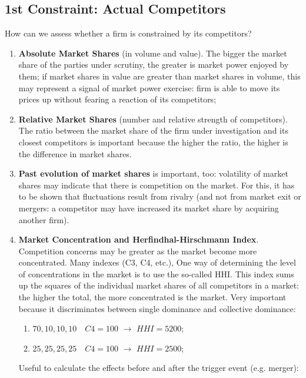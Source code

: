     \subsection{1st Constraint: Actual Competitors}

        How can we assess whether a firm is constrained by its competitors?
        \begin{enumerate}
            \item \textbf{Absolute Market Shares} (in volume and value). The bigger the market share of the parties under scrutiny, the greater is market power enjoyed by them; if market shares in value are greater than market shares in volume, this may represent a signal of market power exercise: firm is able to move its prices up without fearing a reaction of its competitors;
            \item \textbf{Relative Market Shares} (number and relative strength of competitors). The ratio between the market share of the firm under investigation and its closest competitors is important because the higher the ratio, the higher is the difference in market shares.
            \item \textbf{Past evolution of market shares} is important, too: volatility of market shares may indicate that there is competition on the market. For this, it has to be shown that fluctuations result from rivalry (and not from market exit or mergers: a competitor may have increased its market share by acquiring another firm).
            \item \textbf{Market Concentration and Herfindhal-Hirschmann Index}. Competition concerns may be greater as the market become more concentrated. Many indexes (C3, C4, etc.), One way of determining the level of concentrations in the market is to use the so-called HHI. This index sums up the squares of the individual market shares of all competitors in a market: the higher the total, the more concentrated is the market. Very important because it discriminates between single dominance and collective dominance:
                \begin{enumerate}
                    \item \(70, 10, 10, 10 \quad  C4 = 100\) \(\rightarrow\) $HHI = 5200$;
                    \item \(25, 25, 25, 25 \quad C4 = 100\) \(\rightarrow\) $HHI = 2500$;
                \end{enumerate}
            Useful to calculate the effects before and after the trigger event (e.g. merger): 
                \Example{
}
\end{enumerate}
